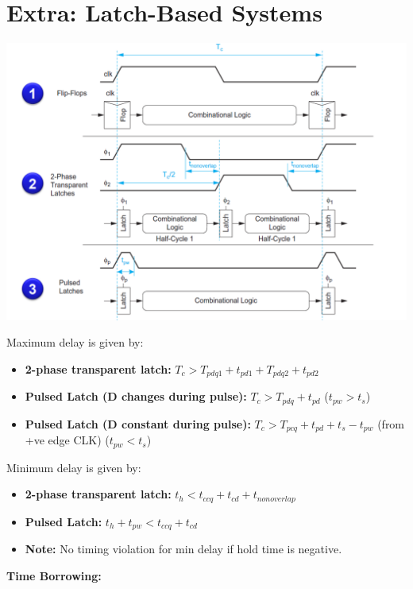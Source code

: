 \documentclass[11pt]{article}
\begin{document}
\section*{Extra: Latch-Based Systems}
    \begin{center}
        \centering
        \includegraphics[scale=0.6]{3}
    \end{center}
    Maximum delay is given by:
    \vspace{5pt}
    \begin{itemize}[topsep=0pt]
        \item \textbf{2-phase transparent latch:} $T_c > T_{pdq1} + t_{pd1} + T_{pdq2} + t_{pd2}$ 
        \item \textbf{Pulsed Latch (D changes during pulse):} $T_c > T_{pdq} + t_{pd}$ ($t_{pw} > t_s$)
        \item \textbf{Pulsed Latch (D constant during pulse):} $T_c > T_{pcq} + t_{pd} + t_s - t_{pw}$ (from +ve edge CLK) ($t_{pw} < t_s$)
    \end{itemize}
    Minimum delay is given by:
    \vspace{5pt}
    \begin{itemize}[topsep=0pt]
        \item \textbf{2-phase transparent latch:} $t_h < t_{ccq} + t_{cd} + t_{nonoverlap}$
        \item \textbf{Pulsed Latch:} $t_h + t_{pw} < t_{ccq} + t_{cd}$
        \item \textbf{Note:} No timing violation for min delay if hold time is negative.\\
    \end{itemize}
    \textbf{Time Borrowing:} \\
\end{document}
